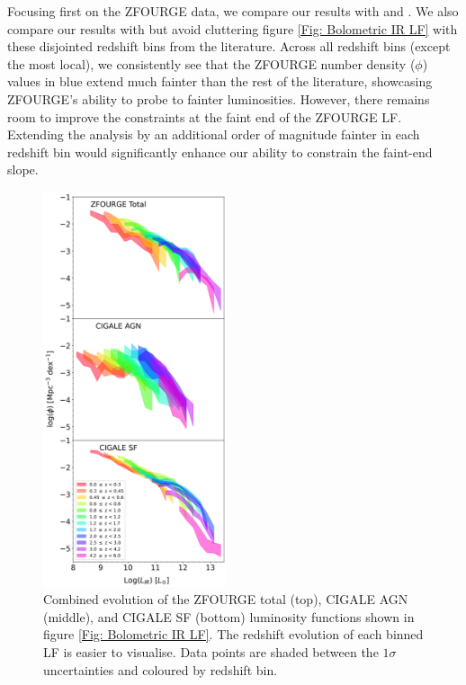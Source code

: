 Focusing first on the ZFOURGE data, we compare our results with \cite{rodighiero_mid-_2010} and \cite{gruppioni_herschel_2013}. We also compare our results with \cite{huang_local_2007, caputi_infrared_2007, fu_decomposing_2010} but avoid cluttering figure \ref{Fig: Bolometric IR LF} with these disjointed redshift bins from the literature. Across all redshift bins (except the most local), we consistently see that the ZFOURGE number density ($\phi$) values in blue extend much fainter than the rest of the literature, showcasing ZFOURGE's ability to probe to fainter luminosities. However, there remains room to improve the constraints at the faint end of the ZFOURGE LF. Extending the analysis by an additional order of magnitude fainter in each redshift bin would significantly enhance our ability to constrain the faint-end slope.

\begin{figure}
    \centering
    \includegraphics[width=0.48\textwidth]{Figures/LF_Filled.png}
    \caption{Combined evolution of the ZFOURGE total (top), CIGALE AGN (middle), and CIGALE SF (bottom) luminosity functions shown in figure \ref{Fig: Bolometric IR LF}. The redshift evolution of each binned LF is easier to visualise. Data points are shaded between the $1\sigma$ uncertainties and coloured by redshift bin.}
    \label{Fig: LF Filled}
\end{figure}

